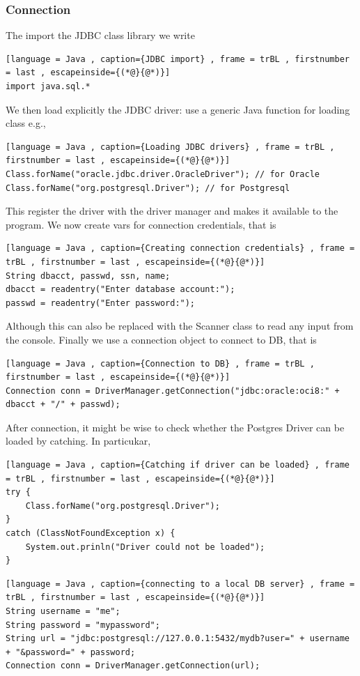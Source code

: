 \documentclass[a4paper]{article}
\theoremstyle{plain}
\theoremstyle{definition}
\newtheorem{exmp}{Example}[section]
\theoremstyle{remark}
\begin{document}
\subsubsection{Connection}
The import the JDBC class library we write
\begin{lstlisting}[language = Java , caption={JDBC import} , frame = trBL , firstnumber = last , escapeinside={(*@}{@*)}]
import java.sql.*
\end{lstlisting}
We then load explicitly the JDBC driver: use a generic Java function for loading class e.g.,
\begin{lstlisting}[language = Java , caption={Loading JDBC drivers} , frame = trBL , firstnumber = last , escapeinside={(*@}{@*)}]
Class.forName("oracle.jdbc.driver.OracleDriver"); // for Oracle
Class.forName("org.postgresql.Driver"); // for Postgresql
\end{lstlisting}
This register the driver with the driver manager and makes it available to the program. We now create vars for connection credentials, that is
\begin{lstlisting}[language = Java , caption={Creating connection credentials} , frame = trBL , firstnumber = last , escapeinside={(*@}{@*)}]
String dbacct, passwd, ssn, name;
dbacct = readentry("Enter database account:");
passwd = readentry("Enter password:");
\end{lstlisting}
Although this can also be replaced with the Scanner class to read any input from the console. Finally we use a connection object to connect to DB, that is
\begin{lstlisting}[language = Java , caption={Connection to DB} , frame = trBL , firstnumber = last , escapeinside={(*@}{@*)}]
Connection conn = DriverManager.getConnection("jdbc:oracle:oci8:" + dbacct + "/" + passwd);
\end{lstlisting}
After connection, it might be wise to check whether the Postgres Driver can be loaded by catching. In particukar,
\begin{lstlisting}[language = Java , caption={Catching if driver can be loaded} , frame = trBL , firstnumber = last , escapeinside={(*@}{@*)}]
try {
	Class.forName("org.postgresql.Driver");
}
catch (ClassNotFoundException x) {
	System.out.prinln("Driver could not be loaded");
}
\end{lstlisting}
\begin{tcolorbox}[colback=black!3!white,colframe=black!60!white,title=\begin{exmp}Connecting to a local DB server \label{Connecting to a local DB server}\end{exmp}]
\begin{lstlisting}[language = Java , caption={connecting to a local DB server} , frame = trBL , firstnumber = last , escapeinside={(*@}{@*)}]
String username = "me";
String password = "mypassword";
String url = "jdbc:postgresql://127.0.0.1:5432/mydb?user=" + username + "&password=" + password;
Connection conn = DriverManager.getConnection(url);
\end{lstlisting}        
\end{tcolorbox}
\end{document}
